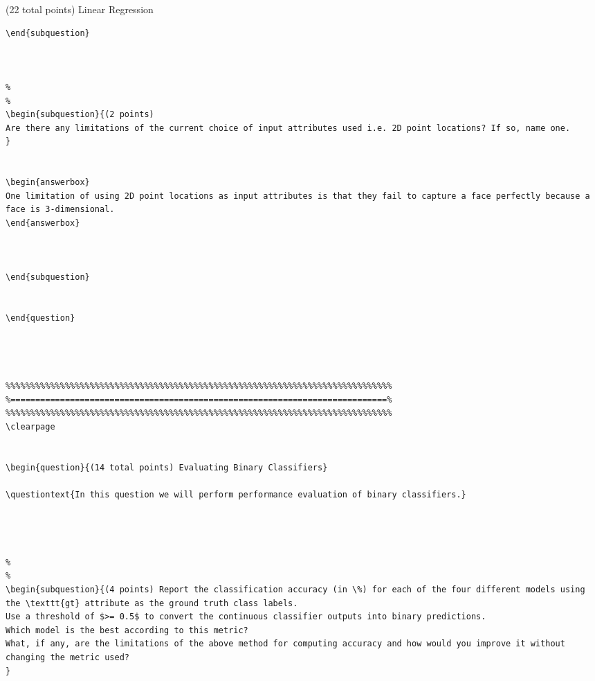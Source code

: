 \documentclass[12pt]{article}
\begin{document}
\begin{question}{(22 total points) Linear Regression}
\begin{subquestion}
\begin{answerbox}{20em}
\begin {verbatim}
\end{subquestion}



%
%
\begin{subquestion}{(2 points) 
Are there any limitations of the current choice of input attributes used i.e. 2D point locations? If so, name one. 
}


\begin{answerbox}{10em}
One limitation of using 2D point locations as input attributes is that they fail to capture a face perfectly because a face is 3-dimensional.
\end{answerbox}



\end{subquestion}


\end{question}




\clearpage


\begin{question}{(14 total points) Evaluating Binary Classifiers}

\questiontext{In this question we will perform performance evaluation of binary classifiers.}




%
%
\begin{subquestion}{(4 points) Report the classification accuracy (in \%) for each of the four different models using the \texttt{gt} attribute as the ground truth class labels. 
Use a threshold of $>= 0.5$ to convert the continuous classifier outputs into binary predictions. 
Which model is the best according to this metric?
What, if any, are the limitations of the above method for computing accuracy and how would you improve it without changing the metric used?
}



\end{verbatim}
\end{answerbox}
\end{subquestion}
\end{question}
\end{document}
